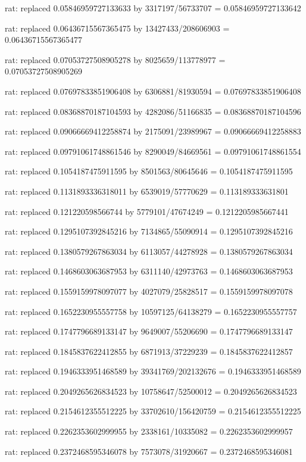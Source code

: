 \documentclass[a4paper,10pt]{article}
\begin{document}
\begin{eulernotebook}
\begin{eulercomment}
\begin{eulercomment}
\begin{eulercomment}
\begin{eulercomment}
\begin{eulercomment}
\begin{eulercomment}
\begin{eulercomment}
\begin{eulercomment}
\begin{eulercomment}
\begin{eulercomment}
\begin{eulercomment}
\begin{eulercomment}
\begin{eulercomment}
\begin{eulercomment}
\begin{eulercomment}
\begin{eulercomment}
\begin{euleroutput}
  rat: replaced 0.05846959727133633 by 3317197/56733707 = 0.05846959727133642
  
  rat: replaced 0.06436715567365475 by 13427433/208606903 = 0.06436715567365477
  
  rat: replaced 0.07053727508905278 by 8025659/113778977 = 0.07053727508905269
  
  rat: replaced 0.07697833851906408 by 6306881/81930594 = 0.07697833851906408
  
  rat: replaced 0.08368870187104593 by 4282086/51166835 = 0.08368870187104596
  
  rat: replaced 0.09066669412258874 by 2175091/23989967 = 0.09066669412258883
  
  rat: replaced 0.09791061748861546 by 8290049/84669561 = 0.09791061748861554
  
  rat: replaced 0.1054187475911595 by 8501563/80645646 = 0.1054187475911595
  
  rat: replaced 0.1131893336318011 by 6539019/57770629 = 0.113189333631801
  
  rat: replaced 0.121220598566744 by 5779101/47674249 = 0.1212205985667441
  
  rat: replaced 0.1295107392845216 by 7134865/55090914 = 0.1295107392845216
  
  rat: replaced 0.1380579267863034 by 6113057/44278928 = 0.1380579267863034
  
  rat: replaced 0.1468603063687953 by 6311140/42973763 = 0.1468603063687953
  
  rat: replaced 0.1559159978097077 by 4027079/25828517 = 0.1559159978097078
  
  rat: replaced 0.1652230955557758 by 10597125/64138279 = 0.1652230955557757
  
  rat: replaced 0.1747796689133147 by 9649007/55206690 = 0.1747796689133147
  
  rat: replaced 0.1845837622412855 by 6871913/37229239 = 0.1845837622412857
  
  rat: replaced 0.1946333951468589 by 39341769/202132676 = 0.1946333951468589
  
  rat: replaced 0.2049265626834523 by 10758647/52500012 = 0.2049265626834523
  
  rat: replaced 0.2154612355512225 by 33702610/156420759 = 0.2154612355512225
  
  rat: replaced 0.2262353602999955 by 2338161/10335082 = 0.2262353602999957
  
  rat: replaced 0.2372468595346078 by 7573078/31920667 = 0.2372468595346081
  

\end{euleroutput}
\end{eulercomment}
\end{eulercomment}
\end{eulercomment}
\end{eulercomment}
\end{eulercomment}
\end{eulercomment}
\end{eulercomment}
\end{eulercomment}
\end{eulercomment}
\end{eulercomment}
\end{eulercomment}
\end{eulercomment}
\end{eulercomment}
\end{eulercomment}
\end{eulercomment}
\end{eulercomment}
\end{eulernotebook}
\end{document}
